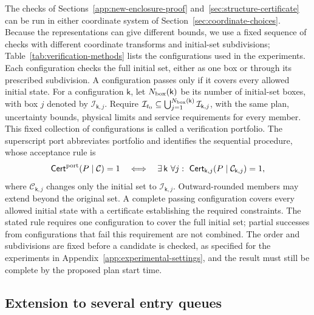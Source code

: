 \documentclass[final]{cas-sc}
\theoremstyle{definition}
\theoremstyle{plain}
\theoremstyle{definition}
\theoremstyle{plain}
\newcommand{\appref}[1]{Appendix~\ref{#1}}
\begin{document}
The checks of Sections~\ref{app:new-enclosure-proof}
and~\ref{sec:structure-certificate} can be run in either coordinate system of
Section~\ref{sec:coordinate-choices}. Because the representations can give
different bounds, we use a fixed sequence of checks with different
coordinate transforms and initial-set subdivisions;
Table~\ref{tab:verification-methods} lists the configurations used in the
experiments. Each configuration checks the full initial set, either as
one box or through its prescribed subdivision. A configuration passes
only if it covers every allowed initial state. For a configuration
$\mathsf k$, let $N_{\rm box}(\mathsf k)$ be its number of initial-set
boxes, with box $j$ denoted by $\mathcal I_{\mathsf k,j}$. Require
$\mathcal I_{t_0}\subseteq
\bigcup_{j=1}^{N_{\rm box}(\mathsf k)}\mathcal I_{\mathsf k,j}$,
with the same plan, uncertainty bounds, physical limits and service
requirements for every member. This fixed collection of configurations
is called a verification portfolio. The superscript $\mathrm{port}$
abbreviates portfolio and identifies the sequential procedure, whose
acceptance rule is
\begin{equation}
\mathsf{Cert}^{\rm port}(P\mid\mathcal C)=1
\quad\Longleftrightarrow\quad
\exists\,\mathsf k\ \forall j:\
\mathsf{Cert}_{\mathsf k,j}(P\mid\mathcal C_{\mathsf k,j})=1,
\label{eq:portfolio-cover-rule}
\end{equation}
where $\mathcal C_{\mathsf k,j}$ changes only the initial set to
$\mathcal I_{\mathsf k,j}$. Outward-rounded members may extend beyond
the original set. A complete passing configuration covers every allowed
initial state with a certificate establishing the required constraints.
The stated rule requires one configuration to cover the full initial
set; partial successes from configurations that fail this requirement
are not combined. The order and subdivisions are fixed before a
candidate is checked, as specified for the experiments in
\appref{app:experimental-settings}, and the result must still be complete by the
proposed plan start time.

\subsection{Extension to several entry queues}
\label{sec:network-extension}
\end{document}

